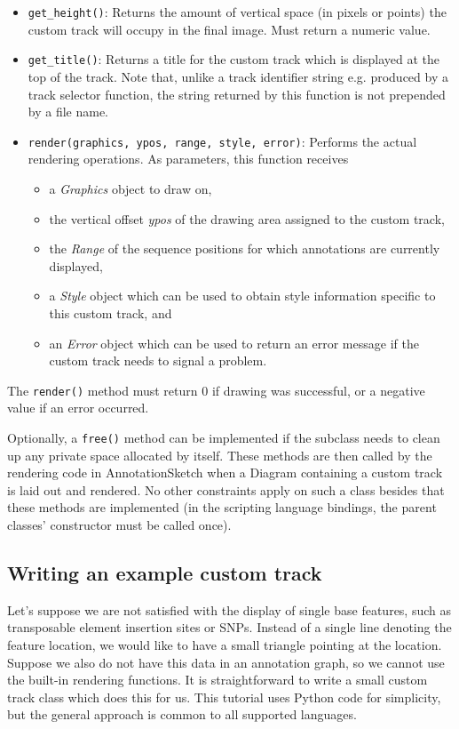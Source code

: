 \documentclass[a4paper]{scrreprt}
\begin{document}
\begin{itemize}
    \item \texttt{get\_height()}: Returns the amount of vertical space (in pixels or points) the custom track will occupy in the final image. Must return a numeric value.
    \item \texttt{get\_title()}: Returns a title for the custom track which is displayed at the top of the track. Note that, unlike a track identifier string e.g. produced by a track selector function, the string returned by this function is not prepended by a file name.
    \item \texttt{render(graphics, ypos, range, style, error)}: Performs the actual rendering operations. As parameters, this function receives
       \begin{itemize}
          \item a \emph{Graphics} object to draw on,
          \item the vertical offset \emph{ypos} of the drawing area assigned to the custom track,
          \item the \emph{Range} of the sequence positions for which annotations are currently displayed,
          \item a \emph{Style} object which can be used to obtain style information specific to this custom track, and
          \item an \emph{Error} object which can be used to return an error message if the custom track needs to signal a problem.
        \end{itemize}
\end{itemize}
The \texttt{render()} method must return 0 if drawing was successful, or a negative value if an error occurred.

Optionally, a \texttt{free()} method can be implemented if the subclass needs to clean up any private space allocated by itself. These methods are then called by the rendering code in AnnotationSketch when a Diagram containing a custom track is laid out and rendered. No other constraints apply on such a class besides that these methods are implemented (in the scripting language bindings, the parent classes' constructor must be called once).

\subsection{Writing an example custom track}

Let's suppose we are not satisfied with the display of single base features, such as transposable element insertion sites or SNPs. Instead of a single line denoting the feature location, we would like to have a small triangle pointing at the location. Suppose we also do not have this data in an annotation graph, so we cannot use the built-in rendering functions. It is straightforward to write a small custom track class which does this for us.
This tutorial uses Python code for simplicity, but the general approach is common to all supported languages.
\end{document}
